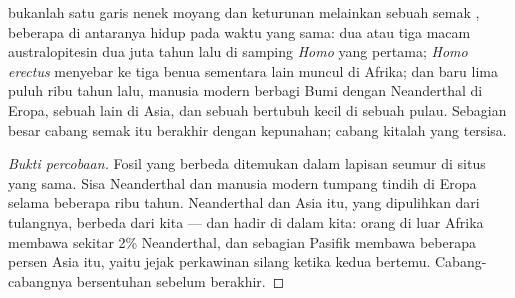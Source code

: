 \begin{proposition}\label{prop:g12:human-evolution:bush}
 bukanlah satu garis nenek moyang dan keturunan
melainkan sebuah semak , beberapa di antaranya hidup pada waktu
yang sama: dua atau tiga macam australopitesin dua juta tahun lalu di
samping \emph{Homo} yang pertama; \emph{Homo erectus} menyebar ke tiga
benua sementara  lain muncul di Afrika; dan baru lima puluh
ribu tahun lalu, manusia modern berbagi Bumi dengan Neanderthal di
Eropa, sebuah  lain di Asia, dan sebuah  bertubuh kecil
di sebuah pulau. Sebagian besar cabang semak itu berakhir dengan
kepunahan; cabang kitalah yang tersisa.
\end{proposition}
\begin{proof}[Bukti percobaan]
Fosil  yang berbeda ditemukan dalam lapisan seumur di situs
yang sama. Sisa Neanderthal dan manusia modern tumpang tindih di Eropa
selama beberapa ribu tahun.  Neanderthal dan   Asia itu,
yang dipulihkan dari tulangnya, berbeda dari  kita --- dan hadir di
dalam kita: orang di luar Afrika membawa sekitar 2\%  Neanderthal,
dan sebagian  Pasifik membawa beberapa persen  
Asia itu, yaitu jejak perkawinan silang ketika kedua  bertemu.
Cabang-cabangnya bersentuhan sebelum berakhir.
\end{proof}

